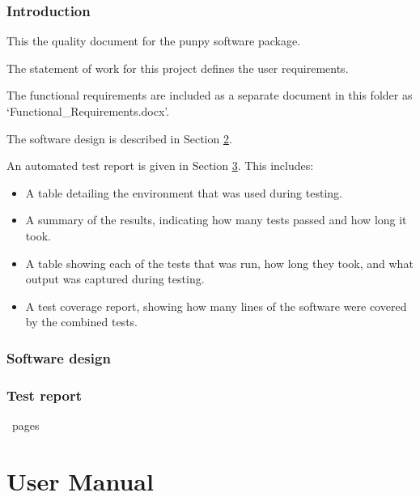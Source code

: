 \documentclass{article}
\begin{document}

\tableofcontents



\clearpage
\pagestyle{long}


\graphicspath{{images/}}
\graphicspath{{./}}

\section{Introduction}\label{introduction}

This the quality document for the punpy software package.


The statement of work for this project defines the user requirements.

The functional requirements are included as a separate document in this folder as `Functional\_Requirements.docx'.

The software design is described in Section \ref{design}.

An automated test report is given in Section \ref{testreport}. This includes:
\begin{itemize}
\item A table detailing the environment that was used during testing.
\item A summary of the results, indicating how many tests passed and how long it took.
\item A table showing each of the tests that was run, how long they took, and what output was captured during testing.
\item A test coverage report, showing how many lines of the software were covered by the combined tests.
\end{itemize}

\clearpage
\section{Software design}\label{design}
%

\clearpage
\section{Test report}\label{testreport}
%
%
%
\the\pdflastximagepages\ pages
    
\clearpage

\part*{User Manual}
{}
\appendix
\def\maketitle{}
\def\tableofcontents{}

\end{document}
